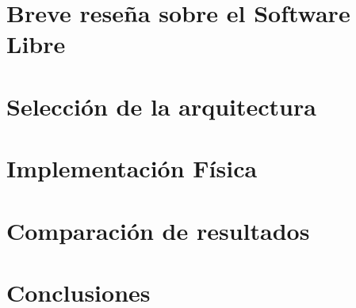 \documentclass[twoside,12pt, pdftex]{classes/CUEDthesisPSnPDF}
\begin{document}
\sloppy

\maketitle
%

\tableofcontents			%
\listoffigures 
\listoftables 

\mainmatter
\part{Breve reseña sobre el Software Libre}
\part{Selección de la arquitectura}\label{seleccion_arquitectura}


\part{Implementación Física}\label{implementacion_fisica}


\part{Comparación de resultados}\label{comparacion_resultados}

\part{Conclusiones}

\appendix


%
\backmatter


\pagestyle{fancyplain}                                                            %
\renewcommand{\partname}{PARTE}
\renewcommand{\chaptermark}[1]{\markboth{\textbf{\small{CAPÍTULO \thechapter}}}{}}%
\renewcommand{\sectionmark}[1]{\markright{\textbf{\small{\thesection. #1}}}}      %





\end{document}
